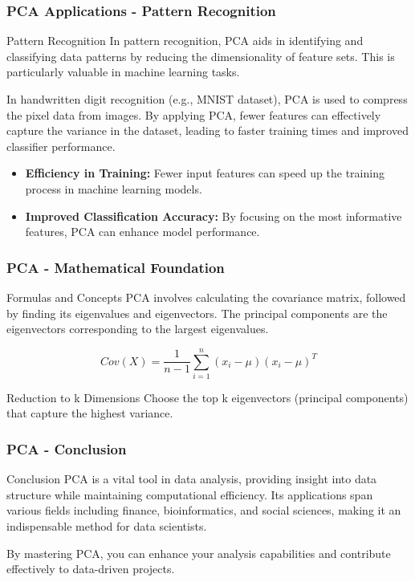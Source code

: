 \documentclass[aspectratio=169]{beamer}
\begin{document}
\begin{frame}[fragile]
    \frametitle{PCA Applications - Pattern Recognition}
    \begin{block}{Pattern Recognition}
        In pattern recognition, PCA aids in identifying and classifying data patterns by reducing the dimensionality of feature sets. This is particularly valuable in machine learning tasks.
    \end{block}
    
    \begin{example}
        In handwritten digit recognition (e.g., MNIST dataset), PCA is used to compress the pixel data from images. By applying PCA, fewer features can effectively capture the variance in the dataset, leading to faster training times and improved classifier performance.
    \end{example}
    
    \begin{itemize}
        \item \textbf{Efficiency in Training:} Fewer input features can speed up the training process in machine learning models.
        \item \textbf{Improved Classification Accuracy:} By focusing on the most informative features, PCA can enhance model performance.
    \end{itemize}
\end{frame}

\begin{frame}[fragile]
    \frametitle{PCA - Mathematical Foundation}
    \begin{block}{Formulas and Concepts}
        PCA involves calculating the covariance matrix, followed by finding its eigenvalues and eigenvectors. The principal components are the eigenvectors corresponding to the largest eigenvalues.
    \end{block}

    \begin{equation}
        Cov(X) = \frac{1}{n-1} \sum_{i=1}^{n} (x_i - \mu)(x_i - \mu)^T
    \end{equation}

    \begin{block}{Reduction to k Dimensions}
        Choose the top k eigenvectors (principal components) that capture the highest variance.
    \end{block}
\end{frame}

\begin{frame}[fragile]
    \frametitle{PCA - Conclusion}
    \begin{block}{Conclusion}
        PCA is a vital tool in data analysis, providing insight into data structure while maintaining computational efficiency. Its applications span various fields including finance, bioinformatics, and social sciences, making it an indispensable method for data scientists.
    \end{block}

    By mastering PCA, you can enhance your analysis capabilities and contribute effectively to data-driven projects.
\end{frame}
\end{document}
